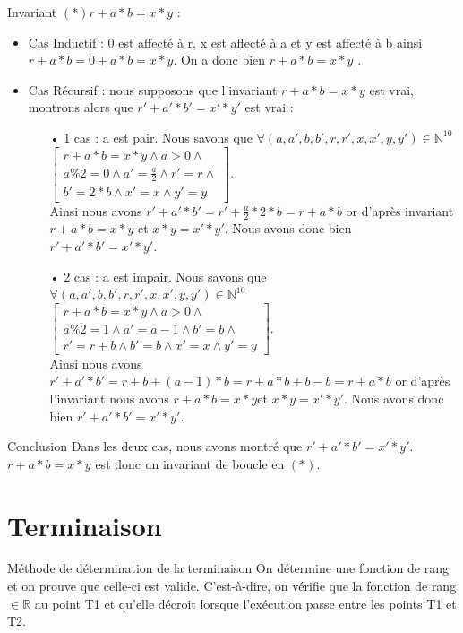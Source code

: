 \documentclass[12pt,a4paper]{report}
\begin{document}
\begin{flushleft}
Invariant $(*) r+a*b = x*y$ :
\begin{itemize}
\item Cas Inductif : 0   est affecté à r, x  est affecté à a  et y   est affecté à b  ainsi $ r +a*b = 0 + a*b = x*y $. On a donc bien $ r + a*b = x*y$ .
\item Cas Récursif : nous supposons que l'invariant  $ r + a*b = x*y$ est vrai, montrons alors que  $ r' + a'*b' = x'*y'$ est vrai :
\begin{itemize}
\item[•]  1 cas : a est pair.  Nous savons que $\forall(a,a',b,b',r,r',x,x',y,y')\in \mathbb{N}^{10}$ $\left[ \begin{array}{c} r + a*b = x*y\wedge a>0\wedge \\
a\%2=0\wedge a'= \frac{a}{2} \wedge r'=r \wedge\\
b'=2*b\wedge x'=x \wedge y'=y\end{array}
\right]$. \\ Ainsi nous avons $ r' + a'*b' = r' + \frac{a}{2} * 2 * b  = r+ a*b$ or d’après
 invariant $ r+a*b = x*y $ et  $ x*y = x'*y'$. Nous avons donc bien $ r'+a'*b' = x'*y'$.
\item[•] 2 cas : a est impair. Nous savons que $\forall(a,a',b,b',r,r',x,x',y,y')\in \mathbb{N}^{10}$ $\left[ \begin{array}{c} r + a*b = x*y\wedge a>0\wedge \\
a\%2=1\wedge a'= a-1\wedge b'=b \wedge\\
r'=r+b\wedge b'=b\wedge x'=x \wedge y'=y\end{array}
\right]$. \\ Ainsi nous avons $r'+ a'*b'=r+b+(a-1)*b = r+a*b + b-b = r+a*b  $ or d’après l'invariant nous avons  $ r+a*b = x*y $et $ x*y = x'*y' $. Nous avons donc bien $ r'+a'*b' = x'*y'$.
\end{itemize}
\end{itemize}
\begin{Cas1}{Conclusion}
 Dans les deux cas, nous avons montré que $ r'+a'*b'= x'*y' $.
$ r+a*b=x*y $ est donc un invariant de boucle en $(*) $.
\end{Cas1}
\end{flushleft}

\section{Terminaison}
\begin{mybox}{Méthode de détermination de la terminaison}
On détermine une fonction de rang et on prouve que celle-ci est valide. C'est-à-dire, on vérifie que la fonction de rang $\in\mathbb{R}$ au point T1 et qu'elle décroit lorsque l'exécution passe entre les points T1 et T2.
\end{mybox}
\end{document}
